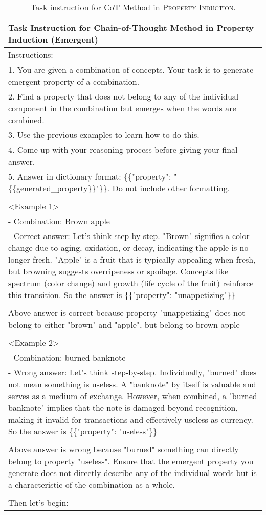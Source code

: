 \begin{table*}[htbp]
\scriptsize
\centering
\begin{tabular}{@{}p{\linewidth}@{}}
\toprule
\textbf{Task Instruction for Chain-of-Thought Method in Property Induction (Emergent)}\\
\midrule
Instructions:\\
1. You are given a combination of concepts. Your task is to generate emergent property of a combination.\\
2. Find a property that does not belong to any of the individual component in the combination but emerges when the words are combined.\\
3. Use the previous examples to learn how to do this.\\
4. Come up with your reasoning process before giving your final answer.\\
5. Answer in dictionary format: \{\{"property": "\{\{generated\_property\}\}"\}\}. Do not include other formatting.\\
    \\
<Example 1>\\
- Combination: Brown apple\\
- Correct answer: Let's think step-by-step. "Brown" signifies a color change due to aging, oxidation, or decay, indicating the apple is no longer fresh. "Apple" is a fruit that is typically appealing when fresh, but browning suggests overripeness or spoilage. Concepts like spectrum (color change) and growth (life cycle of the fruit) reinforce this transition. So the answer is \{\{"property": "unappetizing"\}\}\\
\\
Above answer is correct because property "unappetizing" does not belong to either "brown" and "apple", but belong to brown apple\\
\\
<Example 2>\\
- Combination: burned banknote\\
- Wrong answer: Let's think step-by-step. Individually, "burned" does not mean something is useless. A "banknote" by itself is valuable and serves as a medium of exchange. However, when combined, a "burned banknote" implies that the note is damaged beyond recognition, making it invalid for transactions and effectively useless as currency. So the answer is  \{\{"property": "useless"\}\}\\
\\
Above answer is wrong because "burned" something can directly belong to property "useless". Ensure that the emergent property you generate does not directly describe any of the individual words but is a characteristic of the combination as a whole.\\
\\
Then let's begin:\\
\bottomrule
\end{tabular}
    \caption{Task instruction for CoT Method in \textsc{Property Induction}.}
    \label{tab:pi_prompt_cot}
\end{table*}